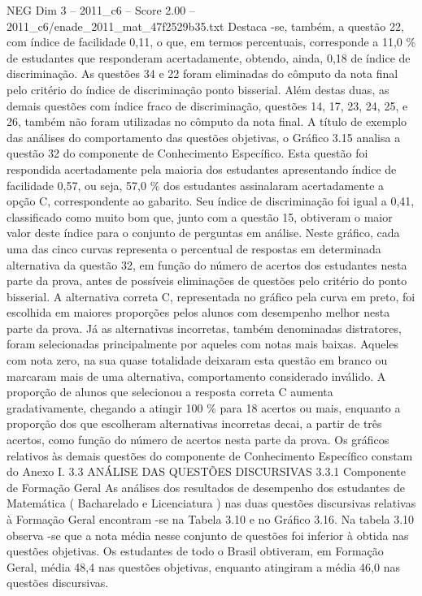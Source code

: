 \begin{textsample}{NEG Dim 3 – 2011\_c6 – Score 2.00 – 2011\_c6/enade\_2011\_mat\_47f2529b35.txt}
Destaca -se, também, a questão 22, com índice de facilidade 0,11, o que, em termos percentuais, corresponde a 11,0 \% de estudantes que responderam acertadamente, obtendo, ainda, 0,18 de índice de discriminação.
As questões 34 e 22 foram eliminadas do cômputo da nota final pelo critério do índice de discriminação ponto bisserial.
Além destas duas, as demais questões com índice fraco de discriminação, questões 14, 17, 23, 24, 25, e 26, também não foram utilizadas no cômputo da nota final.
A título de exemplo das análises do comportamento das questões objetivas, o Gráfico 3.15 analisa a questão 32 do componente de Conhecimento Específico.
Esta questão foi respondida acertadamente pela maioria dos estudantes apresentando índice de facilidade 0,57, ou seja, 57,0 \% dos estudantes assinalaram acertadamente a opção C, correspondente ao gabarito.
Seu índice de discriminação foi igual a 0,41, classificado como muito bom que, junto com a questão 15, obtiveram o maior valor deste índice para o conjunto de perguntas em análise.
Neste gráfico, cada uma das cinco curvas representa o percentual de respostas em determinada alternativa da questão 32, em função do número de acertos dos estudantes nesta parte da prova, antes de possíveis eliminações de questões pelo critério do ponto bisserial.
A alternativa correta C, representada no gráfico pela curva em preto, foi escolhida em maiores proporções pelos alunos com desempenho melhor nesta parte da prova.
Já as alternativas incorretas, também denominadas distratores, foram selecionadas principalmente por aqueles com notas mais baixas.
Aqueles com nota zero, na sua quase totalidade deixaram esta questão em branco ou marcaram mais de uma alternativa, comportamento considerado inválido.
A proporção de alunos que selecionou a resposta correta C aumenta gradativamente, chegando a atingir 100 \% para 18 acertos ou mais, enquanto a proporção dos que escolheram alternativas incorretas decai, a partir de três acertos, como função do número de acertos nesta parte da prova.
Os gráficos relativos às demais questões do componente de Conhecimento Específico constam do Anexo I. 3.3 ANÁLISE DAS QUESTÕES DISCURSIVAS 3.3.1 Componente de Formação Geral As análises dos resultados de desempenho dos estudantes de Matemática ( Bacharelado e Licenciatura ) nas duas questões discursivas relativas à Formação Geral encontram -se na Tabela 3.10 e no Gráfico 3.16.
Na tabela 3.10 observa -se que a nota média nesse conjunto de questões foi inferior à obtida nas questões objetivas.
Os estudantes de todo o Brasil obtiveram, em Formação Geral, média 48,4 nas questões objetivas, enquanto atingiram a média 46,0 nas questões discursivas.

\end{textsample}
